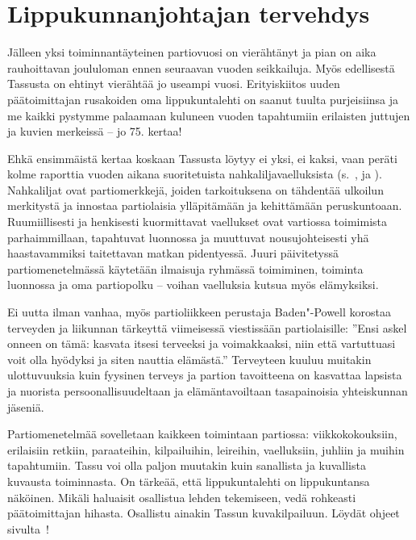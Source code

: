 \section{Lippukunnanjohtajan tervehdys}

\begin{multicols}{2}
\noindent Jälleen yksi toiminnantäyteinen partiovuosi on vierähtänyt ja pian on aika rauhoittavan joululoman ennen seuraavan vuoden seikkailuja. Myös edellisestä Tassusta on ehtinyt vierähtää jo useampi vuosi. Erityiskiitos uuden päätoimittajan rusakoiden oma lippukuntalehti on saanut tuulta purjeisiinsa ja me kaikki pystymme palaamaan kuluneen vuoden tapahtumiin erilaisten juttujen ja kuvien merkeissä -- jo 75. kertaa!

Ehkä ensimmäistä kertaa koskaan Tassusta löytyy ei yksi, ei kaksi, vaan peräti kolme raporttia vuoden aikana suoritetuista nahkaliljavaelluksista (s.~\pageref{section:vihreaNahkalilja}, \pageref{section:mustaNahkalilja} ja \pageref{section:punainenNahkalilja}). Nahkaliljat ovat partiomerkkejä, joiden tarkoituksena on tähdentää ulkoilun merkitystä ja innostaa partiolaisia ylläpitämään ja kehittämään peruskuntoaan. Ruumiillisesti ja henkisesti kuormittavat vaellukset ovat vartiossa toimimista parhaimmillaan, tapahtuvat luonnossa ja muuttuvat nousujohteisesti yhä haastavammiksi taitettavan matkan pidentyessä. Juuri päivitetyssä partiomenetelmässä käytetään ilmaisuja ryhmässä toimiminen, toiminta luonnossa ja oma partiopolku -- voihan vaelluksia kutsua myös elämyksiksi.

Ei uutta ilman vanhaa, myös partioliikkeen perustaja Baden"-Powell korostaa terveyden ja liikunnan tärkeyttä viimeisessä viestissään partiolaisille: ''Ensi askel onneen on tämä: kasvata itsesi terveeksi ja voimakkaaksi, niin että vartuttuasi voit olla hyödyksi ja siten nauttia elämästä.'' Terveyteen kuuluu muitakin ulottuvuuksia kuin fyysinen terveys ja partion tavoitteena on kasvattaa lapsista ja nuorista persoonallisuudeltaan ja elämäntavoiltaan tasapainoisia yhteiskunnan jäseniä.

Partiomenetelmää sovelletaan kaikkeen toimintaan partiossa: viikkokokouksiin, erilaisiin retkiin, paraateihin, kilpailuihin, leireihin, vaelluksiin, juhliin ja muihin tapahtumiin. Tassu voi olla paljon muutakin kuin sanallista ja kuvallista kuvausta toiminnasta. On tärkeää, että lippukuntalehti on lippukuntansa näköinen. Mikäli haluaisit osallistua lehden tekemiseen, vedä rohkeasti päätoimittajan hihasta. Osallistu ainakin Tassun kuvakilpailuun. Löydät ohjeet sivulta~\pageref{section:kuvakilpailu}!


\end{multicols}
